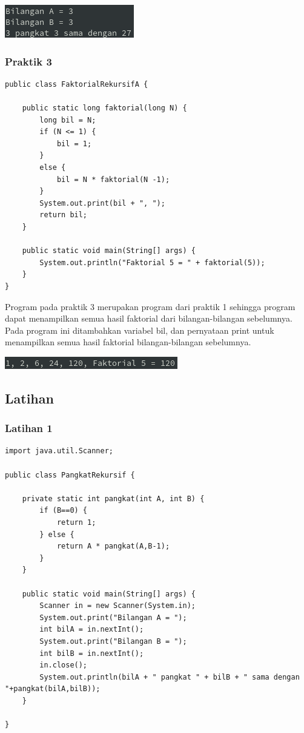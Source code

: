 \documentclass[a4paper,12pt]{article}
\begin{document}
\begin{center}
    \includegraphics[scale=1]{2.png} 
\end{center}


\subsubsection{Praktik 3}
\begin{lstlisting}
public class FaktorialRekursifA {

    public static long faktorial(long N) {
        long bil = N;
        if (N <= 1) {
            bil = 1;
        }
        else {
            bil = N * faktorial(N -1);
        }
        System.out.print(bil + ", ");
        return bil;
    }

    public static void main(String[] args) {
        System.out.println("Faktorial 5 = " + faktorial(5));
    }
}
\end{lstlisting}
Program pada praktik 3 merupakan program dari praktik 1 sehingga program dapat menampilkan semua hasil faktorial dari
bilangan-bilangan sebelumnya. Pada program ini ditambahkan variabel bil, dan pernyataan print untuk menampilkan semua
hasil faktorial bilangan-bilangan sebelumnya.

\begin{center}
    \includegraphics[scale=1]{3.png} 
\end{center}

\newpage

\subsection{Latihan}
\subsubsection{Latihan 1}
\begin{lstlisting}
import java.util.Scanner;

public class PangkatRekursif {

    private static int pangkat(int A, int B) {
        if (B==0) {
            return 1;
        } else {
            return A * pangkat(A,B-1);
        }
    }

    public static void main(String[] args) {
        Scanner in = new Scanner(System.in);
        System.out.print("Bilangan A = ");
        int bilA = in.nextInt();
        System.out.print("Bilangan B = ");
        int bilB = in.nextInt();
        in.close();
        System.out.println(bilA + " pangkat " + bilB + " sama dengan "+pangkat(bilA,bilB));
    }

}
\end{lstlisting}
\end{document}
